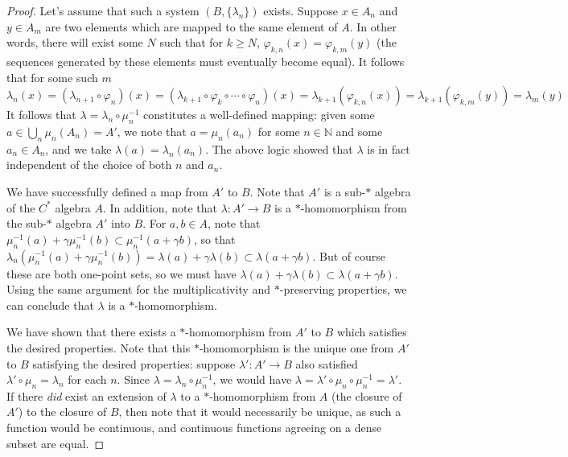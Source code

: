 \documentclass[aps,pra,showpacs,notitlepage,onecolumn,superscriptaddress,nofootinbib]{revtex4-1}
\theoremstyle{definition}
\begin{document}
\begin{proof}
  \noindent Let's assume that such a system $(B, \{\lambda_n\})$ exists. Suppose $x \in A_n$ and $y \in A_m$ are two elements which are mapped to the same element of $A$. In other words,
  there will exist some $N$ such that for $k \geq N$, $\varphi_{k, n}(x) = \varphi_{k, m}(y)$ (the sequences generated by these elements must eventually become equal). It follows that for some such $m$
  \begin{equation}
    \lambda_n(x) = (\lambda_{n + 1} \circ \varphi_n)(x) = (\lambda_{k + 1} \circ \varphi_{k} \circ \cdots \circ \varphi_n)(x) = \lambda_{k + 1}(\varphi_{k, n}(x)) = \lambda_{k + 1}(\varphi_{k, m}(y)) = \lambda_m(y)
  \end{equation}
  It follows that $\lambda = \lambda_n \circ \mu_n^{-1}$ constitutes a well-defined mapping: given some $a \in \bigcup_{n} \mu_n(A_n) = A'$, we
  note that $a = \mu_n(a_n)$ for some $n \in \mathbb{N}$ and some $a_n \in A_n$, and we take $\lambda(a) = \lambda_n(a_n)$. The above logic showed that $\lambda$ is in fact independent of the choice of both $n$ and $a_n$.
  \newline

  \noindent We have successfully defined a map from $A'$ to $B$. Note that $A'$ is a sub-$*$ algebra of the $C^{*}$ algebra $A$. In addition, note that $\lambda : A' \rightarrow B$ is a $*$-homomorphism
  from the sub-$*$ algebra $A'$ into $B$.  For $a, b \in A$, note that $\mu_n^{-1}(a) + \gamma \mu_n^{-1}(b) \subset \mu_n^{-1}(a + \gamma b)$, so
  that $\lambda_n (\mu_n^{-1}(a) + \gamma \mu_n^{-1}(b)) = \lambda(a) + \gamma \lambda(b) \subset \lambda(a + \gamma b)$. But of course these are both one-point sets, so we must have $\lambda(a) + \gamma \lambda(b) \subset \lambda(a + \gamma b)$.
  Using the same argument for the multiplicativity and $*$-preserving properties, we can conclude that $\lambda$ is a $*$-homomorphism.
  \newline

  \noindent We have shown that there exists a $*$-homomorphism from $A'$ to $B$ which satisfies the desired properties. Note that this $*$-homomorphism is the unique one from $A'$ to $B$ satisfying the desired properties: suppose $\lambda' : A' \rightarrow B$
  also satisfied $\lambda' \circ \mu_n = \lambda_n$ for each $n$. Since $\lambda = \lambda_n \circ \mu_n^{-1}$, we would have $\lambda = \lambda' \circ \mu_n \circ \mu_n^{-1} = \lambda'$. If there \emph{did} exist an extension of $\lambda$ to a $*$-homomorphism
  from $A$ (the closure of $A'$) to the closure of $B$, then note that it would necessarily be unique, as such a function would be continuous, and continuous functions agreeing on a dense subset are equal.
  \newline


\end{proof}
\end{document}

